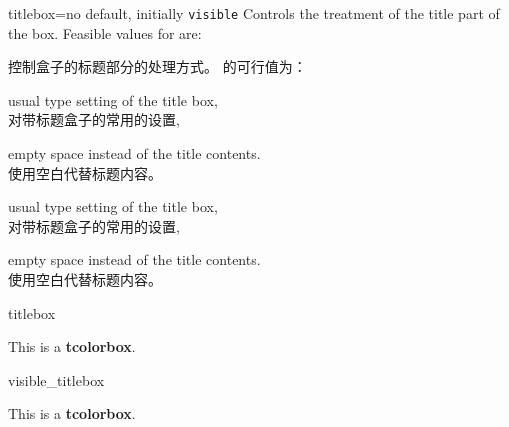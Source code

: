 \begin{docTcbKey}[][doc new=2019-03-01]{titlebox}{=}{no default, initially \texttt{visible}}
Controls the treatment of the title part of the box.
Feasible values for  are:

控制盒子的标题部分的处理方式。  的可行值为：

\begin{DescriptionL}{}
\item[\docValue{visible}]usual type setting of the title box,\\
对带标题盒子的常用的设置,
\item[\docValue{invisible}]empty space instead of the title contents.\\
使用空白代替标题内容。
\end{DescriptionL}

\begin{DescriptionLsqueezed}{}
\item[\docValue{visible}]usual type setting of the title box,\\
对带标题盒子的常用的设置,
\item[\docValue{invisible}]empty space instead of the title contents.\\
使用空白代替标题内容。
\end{DescriptionLsqueezed}


\begin{exdispExample}{titlebox}
\begin{tcolorbox}[title=My invisible title,
  titlebox=invisible]
This is a \textbf{tcolorbox}.
\end{tcolorbox}
\end{exdispExample}

\begin{exdispExample}{visible_titlebox}
  \begin{tcolorbox}[title=My visible title,
    titlebox=visible]
  This is a \textbf{tcolorbox}.
  \end{tcolorbox}
  \end{exdispExample}
\end{docTcbKey}



